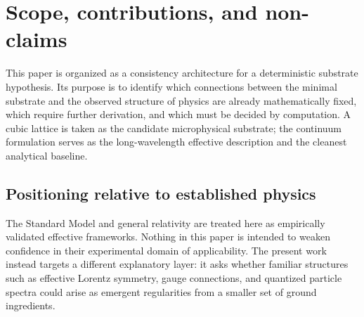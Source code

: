 \section{Scope, contributions, and non-claims}
\label{sec:scope}

This paper is organized as a consistency architecture for a deterministic substrate hypothesis.
Its purpose is to identify which connections between the minimal substrate and the observed structure of physics
are already mathematically fixed, which require further derivation, and which must be decided by computation.
A cubic lattice is taken as the candidate microphysical substrate; the continuum formulation serves as
the long-wavelength effective description and the cleanest analytical baseline.

\subsection{Positioning relative to established physics}
The Standard Model and general relativity are treated here as empirically validated effective frameworks.
Nothing in this paper is intended to weaken confidence in their experimental domain of applicability.
The present work instead targets a different explanatory layer: it asks whether familiar structures such as
effective Lorentz symmetry, gauge connections, and quantized particle spectra could arise as emergent regularities
from a smaller set of ground ingredients.

